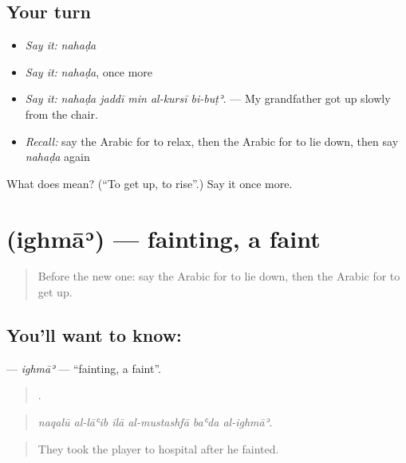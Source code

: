 \subsection*{Your turn}
\begin{itemize}
\raggedright
  \item \emph{Say it:} \emph{nahaḍa}
  \item \emph{Say it:} \emph{nahaḍa}, once more
  \item \emph{Say it:} \emph{nahaḍa jaddī min al-kursī bi-buṭʾ.} — My grandfather got up slowly from the chair.
  \item \emph{Recall:} say the Arabic for to relax, then the Arabic for to lie down, then say \emph{nahaḍa} again
\end{itemize}

\begin{tcolorbox}[breakable,colback=teal!4,colframe=teal!35!black,title={Before you move on}]
What does  mean? (\textquotedblleft{}To get up, to rise\textquotedblright{}.) Say it once more.
\end{tcolorbox}
\section[\texorpdfstring{\ar{إغماء} (ighmāʾ)}{إغماء (ighmāʾ)}]{ (ighmāʾ) — fainting, a faint}

\label{lesson:AR-C515-ighma}



\begin{quote}
Before the new one: say the Arabic for to lie down, then the Arabic for to get up.
\end{quote}

\subsection*{You'll want to know: }
\textbf{} — \emph{ighmāʾ} — \textquotedblleft{}fainting, a faint\textquotedblright{}.

\begin{quote}
     .
\end{quote}

\begin{quote}
\emph{naqalū al-lāʿib ilā al-mustashfā baʿda al-ighmāʾ.}
\end{quote}

\begin{quote}
They took the player to hospital after he fainted.
\end{quote}

